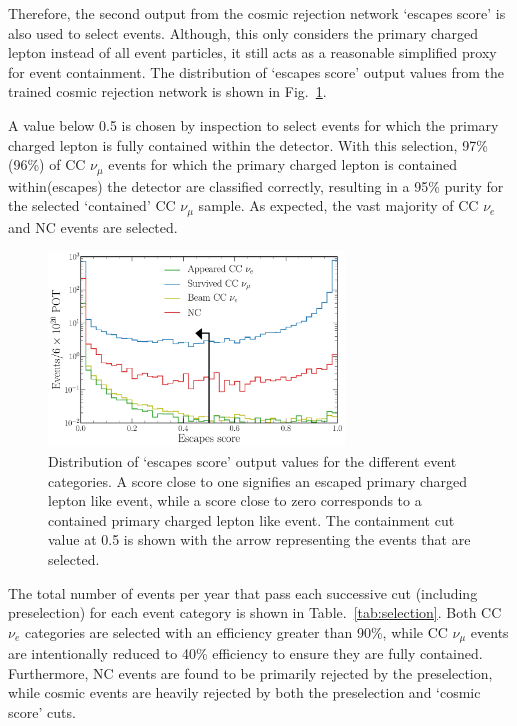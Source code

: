 Therefore, the second output from the cosmic rejection network `escapes score' is also used to
select events. Although, this only considers the primary charged lepton instead of all event
particles, it still acts as a reasonable simplified proxy for event containment. The distribution
of `escapes score' output values from the trained cosmic rejection network is shown in
Fig.~\ref{fig:final_escapes_outputs}.

A value below 0.5 is chosen by inspection to select events for which the primary charged lepton is
fully contained within the detector. With this selection, 97\%(96\%) of CC $\nu_{\mu}$ events for
which the primary charged lepton is contained within(escapes) the detector are classified
correctly, resulting in a 95\% purity for the selected `contained' CC $\nu_{\mu}$ sample. As
expected, the vast majority of CC $\nu_{e}$ and NC events are selected.

\begin{figure} %
    \includegraphics[width=0.7\textwidth]{diagrams/6-cvn/chipsnet/final_escapes_outputs.pdf}
    \caption[Distribution of escapes score output values.]
    {Distribution of `escapes score' output values for the different event categories. A score
        close to one signifies an escaped primary charged lepton like event, while a score close
        to zero corresponds to a contained primary charged lepton like event. The containment cut
        value at 0.5 is shown with the arrow representing the events that are selected.}
    \label{fig:final_escapes_outputs}
\end{figure}

The total number of events per year that pass each successive cut (including preselection) for
each event category is shown in Table.~\ref{tab:selection}. Both CC $\nu_{e}$ categories are
selected with an efficiency greater than 90\%, while CC $\nu_{\mu}$ events are intentionally
reduced to 40\% efficiency to ensure they are fully contained. Furthermore, NC events are found to
be primarily rejected by the preselection, while cosmic events are heavily rejected by both the
preselection and `cosmic score' cuts.

